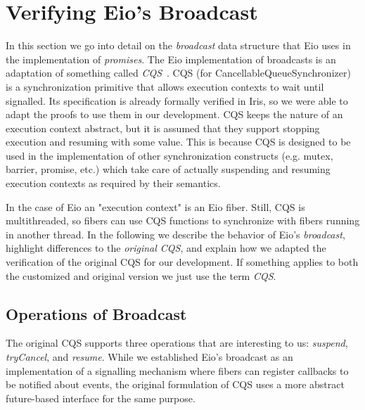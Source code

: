 \section{Verifying Eio's Broadcast}
\label{sec:broadcast}


In this section we go into detail on the \emph{broadcast} data structure that Eio uses in the implementation of \emph{promises}.
The Eio implementation of broadcasts is an adaptation of something called \emph{CQS}~\cite{koval2023cqs}.
CQS (for CancellableQueueSynchronizer) is a synchronization primitive that allows execution contexts to wait until signalled.
Its specification is already formally verified in Iris, so we were able to adapt the proofs to use them in our development.
CQS keeps the nature of an execution context abstract, but it is assumed that they support stopping execution and resuming with some value.
This is because CQS is designed to be used in the implementation of other synchronization constructs (e.g. mutex, barrier, promise, etc.) which take care of actually suspending and resuming execution contexts as required by their semantics.


In the case of Eio an "execution context" is an Eio fiber.
Still, CQS is multithreaded, so fibers can use CQS functions to synchronize with fibers running in another thread.
In the following we describe the behavior of Eio's \emph{broadcast}, highlight differences to the \emph{original CQS}, and explain how we adapted the verification of the original CQS for our development.
If something applies to both the customized and original version we just use the term \emph{CQS}.

\subsection{Operations of Broadcast}
\label{sec:broadcast-operations}


The original CQS supports three operations that are interesting to us: \emph{suspend}, \emph{tryCancel}, and \emph{resume}.
While we established Eio's broadcast as an implementation of a signalling mechanism where fibers can register callbacks to be notified about events, the original formulation of CQS uses a more abstract future-based interface for the same purpose.

